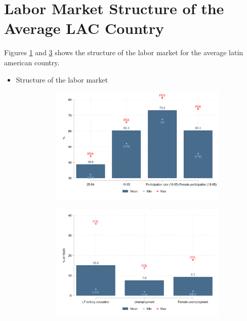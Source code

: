 \documentclass[english]{article}
\begin{document}
\section{Labor Market Structure of the Average LAC Country}
Figures \ref{fig:labmarket1} and \ref{fig:labmarket2} shows the structure of the labor market for the average latin american country. 
\begin{itemize}
    \item Structure of the labor market 
    
\begin{figure}[!htb]
\justifying
  \caption{Demographic profile and structure of labor market}
\begin{subfigure}{.9\textwidth}
  \centering
  \includegraphics[width=1\linewidth]{latex/figures/Snapshot/Structure of labor market_a.png}
  \label{fig:labmarket1}
\end{subfigure}

\begin{subfigure}{.9\textwidth}
  \centering
  \includegraphics[width=1\linewidth]{latex/figures/Snapshot/Structure of labor market_b.png}
  \label{fig:labmarket2}
\end{subfigure}


\end{figure}
\end{itemize}
\end{document}
